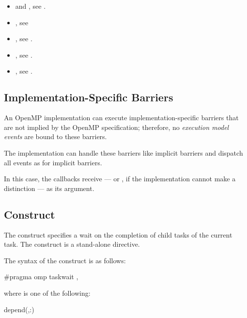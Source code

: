 \crossreferences
\begin{itemize}

\item {} and , see
  .

\item {}, see

\item {}, see
  .

\item {}, see
  .

\item {}, see
  .

\end{itemize}


\subsection{Implementation-Specific Barriers}
\label{subsec:implementation-specific-barrier}

An OpenMP implementation can execute implementation-specific barriers
that are not implied by the OpenMP specification; therefore, no \emph{execution
model events} are bound to these barriers.

The implementation can handle these barriers like implicit barriers and
dispatch all events as for implicit barriers. 

In this case, the callbacks receive
 --- or
, if the implementation cannot make a
distinction --- as its  argument.





\subsection{ Construct}
\label{subsec:taskwait Construct}
\summary
The  construct specifies a wait on the completion of child tasks
of the current task. The  construct is a stand-alone directive.

\syntax
\begin{ccppspecific}
The syntax of the  construct is as follows:

\begin{ompcPragma}
#pragma omp taskwait \plc{[clause[ [},\plc{] clause] ... ] new-line}
\end{ompcPragma}

where  is one of the following:

\begin{indentedcodelist}
depend(\plc{[depend-modifier},\plc{]dependence-type }:)
\end{indentedcodelist}
\end{ccppspecific}

